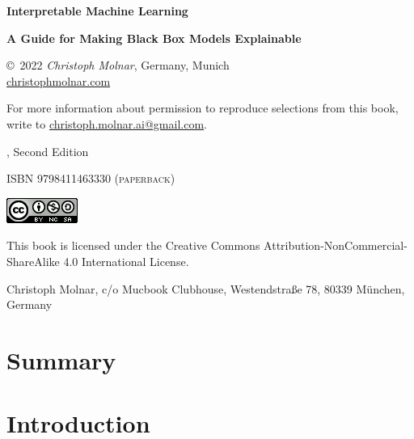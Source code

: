 \documentclass[
  10pt,
]{scrbook}
\begin{document}
\thispagestyle{empty}
\begin{center}
  {
  \bfseries \sffamily \LARGE Interpretable Machine Learning\par
  \bfseries \small A Guide for Making Black Box Models Explainable\par
}

\copyright~2022 \textit{Christoph Molnar}, Germany, Munich\\
\url{christophmolnar.com}

For more information about permission to reproduce selections from this book, write to \url{christoph.molnar.ai@gmail.com}.

	\the\year, Second Edition

\ifxetex
	\textsc{ISBN 9798411463330 (paperback)} 
\fi

\includegraphics{images/by-nc-sa.png}

This book is licensed under the Creative Commons Attribution-NonCommercial-ShareAlike 4.0 International License.
  
  Christoph Molnar,
  c/o Mucbook Clubhouse,
  Westendstraße 78,
  80339 München, Germany

\end{center}

\newpage
\thispagestyle{empty}
\mbox{}
\newpage








{
\hypersetup{linkcolor=}
\setcounter{tocdepth}{1}
\tableofcontents
}
\hypertarget{summary}{%
\chapter{Summary}\label{summary}}

\hypertarget{introduction}{%
\chapter{Introduction}\label{introduction}}
\end{document}
